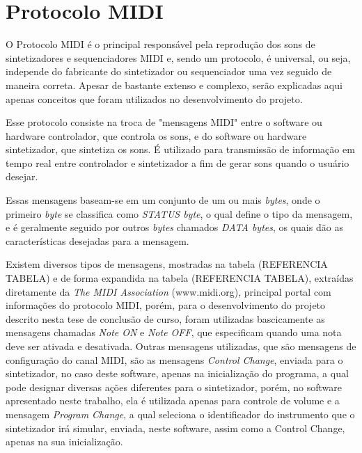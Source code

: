 \documentclass[12pt]{report}
\begin{document}

\chapter{Protocolo MIDI}
\label{cha:cha3}

O Protocolo MIDI é o principal responsável pela reprodução dos sons de sintetizadores e sequenciadores MIDI e, sendo um protocolo, é universal, ou seja, independe do fabricante do sintetizador ou sequenciador uma vez seguido de maneira correta. Apesar de bastante extenso e complexo, serão explicadas aqui apenas conceitos que foram utilizados no desenvolvimento do projeto.

Esse protocolo consiste na troca de "mensagens MIDI" entre o software ou hardware controlador, que controla os sons, e do software ou hardware sintetizador, que sintetiza os sons. É utilizado para transmissão de informação em tempo real entre controlador e sintetizador a fim de gerar sons quando o usuário desejar.

Essas mensagens baseam-se em um conjunto de um ou mais {\it bytes}, onde o primeiro {\it byte} se classifica como {\it STATUS byte}, o qual define o tipo da mensagem, e é geralmente seguido por outros {\it bytes} chamados {\it DATA bytes}, os quais dão as características desejadas para a mensagem.

Existem diversos tipos de mensagens, mostradas na tabela (REFERENCIA TABELA) e de forma expandida na tabela (REFERENCIA TABELA), extraídas diretamente da {\it The MIDI Association} (www.midi.org), principal portal com informações do protocolo MIDI, porém, para o desenvolvimento do projeto descrito nesta tese de conclusão de curso, foram utilizadas bascicamente as mensagens chamadas {\it Note ON} e {\it Note OFF}, que especificam quando uma nota deve ser ativada e desativada. Outras mensagens utilizadas, que são mensagens de configuração do canal MIDI, são as mensagens {\it Control Change}, enviada para o sintetizador, no caso deste software, apenas na inicialização do programa, a qual pode designar diversas ações diferentes para o sintetizador, porém, no software apresentado neste trabalho, ela é utilizada apenas para controle de volume e a mensagem {\it Program Change}, a qual seleciona o identificador do instrumento que o sintetizador irá simular, enviada, neste software, assim como a Control Change, apenas na sua inicialização.
\end{document}
